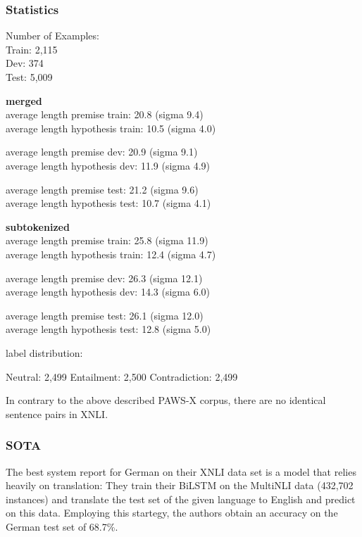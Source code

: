 \subsubsection{Statistics}

Number of Examples: \\
Train: 2,115 \\
Dev: 374 \\
Test: 5,009

\textbf{merged} \\
average length premise train: 20.8 (sigma 9.4) \\
average length hypothesis train: 10.5 (sigma 4.0)

average length premise dev: 20.9 (sigma 9.1) \\
average length hypothesis dev: 11.9 (sigma 4.9)

average length premise test: 21.2 (sigma 9.6) \\
average length hypothesis test: 10.7 (sigma 4.1)


\textbf{subtokenized} \\
average length premise train: 25.8 (sigma 11.9) \\
average length hypothesis train: 12.4 (sigma 4.7)

average length premise dev: 26.3 (sigma 12.1) \\
average length hypothesis dev: 14.3 (sigma 6.0)

average length premise test: 26.1 (sigma 12.0) \\
average length hypothesis test: 12.8 (sigma 5.0)


label distribution:

Neutral: 2,499
Entailment: 2,500
Contradiction: 2,499


In contrary to the above described PAWS-X corpus, there are no identical sentence pairs in XNLI.

\subsubsection{SOTA}

The best system \cite{conneau2018xnli} report for German on their XNLI data set is a model that
relies heavily on translation:
They train their BiLSTM on the MultiNLI data (432,702 instances) and translate the test set of the
given language to English and predict on this data.
Employing this startegy, the authors obtain an accuracy on the German test set of 68.7\%.




